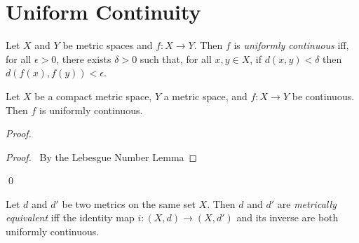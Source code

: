 \section{Uniform Continuity}

\begin{df}
  Let $X$ and $Y$ be metric spaces and $f : X \rightarrow Y$. Then $f$ is
  \emph{uniformly continuous} iff, for all $\epsilon > 0$, there exists
  $\delta > 0$ such that, for all $x, y \in X$, if $d(x, y) < \delta$ then
  $d(f(x), f(y)) < \epsilon$.
\end{df}

\begin{thm}
  Let $X$ be a compact metric space, $Y$ a metric space, and $f : X
  \rightarrow Y$ be continuous. Then $f$ is uniformly continuous.
\end{thm}

\begin{proof}
  \pf
  \begin{proof}
    \pf\ By the Lebesgue Number Lemma
  \end{proof}
  \qed
\end{proof}

\begin{df}
  Let $d$ and $d'$ be two metrics on the same set $X$. Then $d$ and $d'$ are \emph{metrically equivalent} iff the identity map $i : (X, d) \rightarrow (X, d')$ and its inverse are both uniformly continuous.
\end{df}
